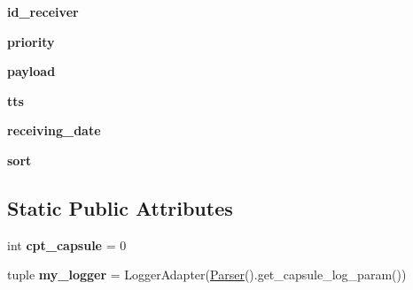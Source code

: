 \begin{DoxyCompactItemize}
\item 
\hypertarget{classorg_1_1swallow__labs_1_1model_1_1_capsule_1_1_capsule_a27d82d64b37fbba7d333fadc4fb32537}{}{\bfseries id\+\_\+receiver}\label{classorg_1_1swallow__labs_1_1model_1_1_capsule_1_1_capsule_a27d82d64b37fbba7d333fadc4fb32537}

\item 
\hypertarget{classorg_1_1swallow__labs_1_1model_1_1_capsule_1_1_capsule_a9b0e2156dcc268e73b9e3dd1c9d4b24c}{}{\bfseries priority}\label{classorg_1_1swallow__labs_1_1model_1_1_capsule_1_1_capsule_a9b0e2156dcc268e73b9e3dd1c9d4b24c}

\item 
\hypertarget{classorg_1_1swallow__labs_1_1model_1_1_capsule_1_1_capsule_a64f07928f2d3ea9a480ac1724ecfe764}{}{\bfseries payload}\label{classorg_1_1swallow__labs_1_1model_1_1_capsule_1_1_capsule_a64f07928f2d3ea9a480ac1724ecfe764}

\item 
\hypertarget{classorg_1_1swallow__labs_1_1model_1_1_capsule_1_1_capsule_a46b2d125351092038fd0601b1519b13b}{}{\bfseries tts}\label{classorg_1_1swallow__labs_1_1model_1_1_capsule_1_1_capsule_a46b2d125351092038fd0601b1519b13b}

\item 
\hypertarget{classorg_1_1swallow__labs_1_1model_1_1_capsule_1_1_capsule_a60c8e6cbe6da0be8a3b5932469d1d25f}{}{\bfseries receiving\+\_\+date}\label{classorg_1_1swallow__labs_1_1model_1_1_capsule_1_1_capsule_a60c8e6cbe6da0be8a3b5932469d1d25f}

\item 
\hypertarget{classorg_1_1swallow__labs_1_1model_1_1_capsule_1_1_capsule_a61626192eb5683e913927da399d8e779}{}{\bfseries sort}\label{classorg_1_1swallow__labs_1_1model_1_1_capsule_1_1_capsule_a61626192eb5683e913927da399d8e779}

\end{DoxyCompactItemize}
\subsection*{Static Public Attributes}
\begin{DoxyCompactItemize}
\item 
\hypertarget{classorg_1_1swallow__labs_1_1model_1_1_capsule_1_1_capsule_a51112c87a445359ee142a67e2f774a16}{}int {\bfseries cpt\+\_\+capsule} = 0\label{classorg_1_1swallow__labs_1_1model_1_1_capsule_1_1_capsule_a51112c87a445359ee142a67e2f774a16}

\item 
\hypertarget{classorg_1_1swallow__labs_1_1model_1_1_capsule_1_1_capsule_a8d6126628399575afaf2f0371f3ce9c0}{}tuple {\bfseries my\+\_\+logger} = Logger\+Adapter(\hyperlink{classorg_1_1swallow__labs_1_1model_1_1_parser_1_1_parser}{Parser}().get\+\_\+capsule\+\_\+log\+\_\+param())\label{classorg_1_1swallow__labs_1_1model_1_1_capsule_1_1_capsule_a8d6126628399575afaf2f0371f3ce9c0}

\end{DoxyCompactItemize}


